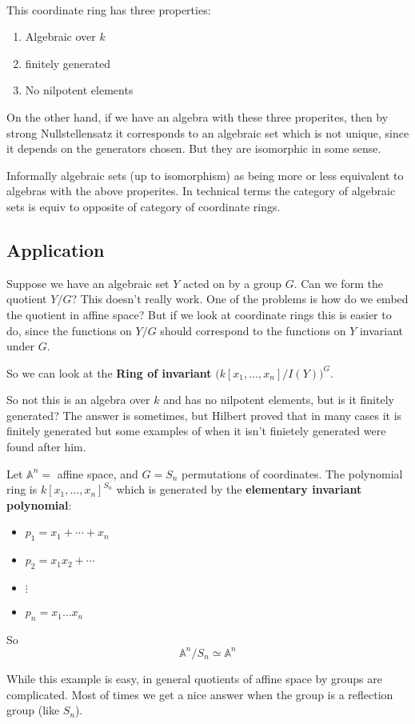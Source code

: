 \

This coordinate ring has three properties:\begin{enumerate}
    \item Algebraic over $k$
    \item finitely generated
    \item No nilpotent elements
\end{enumerate}

On the other hand, if we have an algebra with these three properites, then by strong Nullstellensatz it corresponds to an algebraic set which is not unique, since it depends on the generators chosen. But they are isomorphic in some sense.


Informally algebraic sets (up to isomorphism) as being more or less equivalent to algebras with the above properites. In technical terms the category of algebraic sets is equiv to opposite of category of coordinate rings.

\subsection{Application}
Suppose we have an algebraic set $Y$ acted on by a group $G$. Can we form the quotient $Y/G$? This doesn't really work. One of the problems is how do we embed the quotient in affine space? But if we look at coordinate rings this is easier to do, since the functions on $Y/G$ should correspond to the functions on $Y$ invariant under $G$.
\begin{center}
    So we can look at the \textbf{Ring of invariant} ${\bigg(k[x_1,\dots,x_n]/I(Y)\bigg)}^G$.     
\end{center}
So not this is an algebra over $k$ and has no nilpotent elements, but is it finitely generated? The answer is sometimes, but Hilbert proved that in many cases it is finitely generated but some examples of when it isn't finietely generated were found after him.


\begin{example}
    Let $\mathbb{A}^n =$ affine space, and $G  = S_n$ permutations of coordinates. The polynomial ring is ${k[x_1,\dots,x_n]}^{S_n}$ which is generated by the \textbf{elementary invariant polynomial}:\begin{itemize}
        \item $p_1 = x_1+\cdots + x_n$
        \item $p_2 = x_1x_2+\cdots$
        \item $\vdots$
        \item $p_n = x_1\dots x_n$
    \end{itemize}

    So \[\mathbb{A}^n/S_n \simeq \mathbb{A}^n\]

    While this example is easy, in general quotients of affine space by groups are complicated. Most of times we get a nice answer when the group is a reflection group (like $S_n$).
\end{example}


